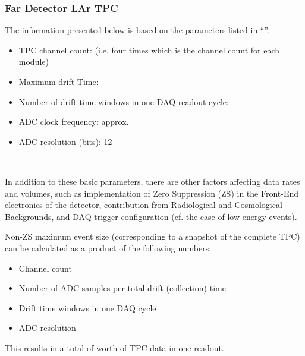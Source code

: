 
\subsubsection{Far Detector LAr TPC}
The information presented below is based on the parameters listed in
``\anxrates''.
\begin{itemize}
\item TPC channel count: \dunenumberchannels (i.e. four times
  \daqchannelspermodule which is the channel count for each \tpcmodulemass module)
\item Maximum drift Time: \tpcdrifttime
\item Number of drift time windows in one DAQ readout cycle: \daqdriftsperreadout
\item ADC clock frequency: approx. \daqsamplerate
\item ADC resolution (bits): 12
\end{itemize}
\

In addition to these basic parameters, there are other factors
affecting data rates and volumes, such as implementation of Zero
Suppression (ZS) in the Front-End electronics of the detector,
contribution from Radiological and Cosmological Backgrounds, and DAQ
trigger configuration (cf. the case of low-energy events).

Non-ZS maximum event size (corresponding to a snapshot of the complete TPC) can be calculated as a product of the following numbers:
\begin{itemize}
\item Channel count
\item Number of ADC samples per total drift (collection) time
\item Drift time windows in one DAQ cycle
\item ADC resolution
\end{itemize}

This results in a total of \dunefsreadoutsize worth of TPC data in one readout.

